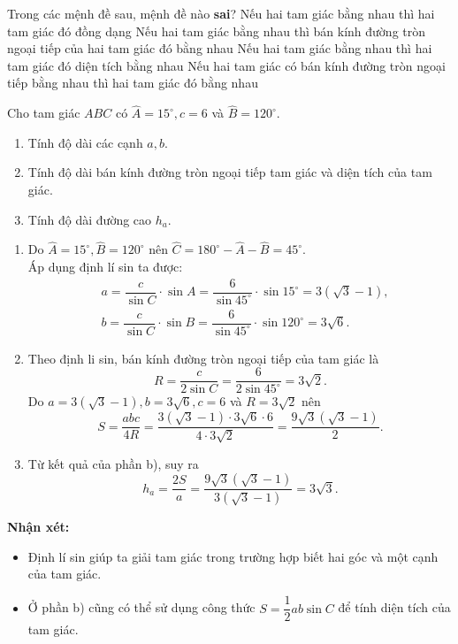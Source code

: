 \begin{ex}%
	Trong các mệnh đề sau, mệnh đề nào \textbf{sai}? 
	\choice 
		{Nếu hai  tam giác bằng nhau thì hai tam giác đó đồng dạng}
		{Nếu hai tam giác bằng nhau thì bán kính đường tròn ngoại tiếp của hai tam giác đó bằng  nhau}
		{Nếu hai tam giác  bằng nhau thì hai tam giác đó diện tích bằng nhau}
		{\True  Nếu hai tam giác có bán kính đường tròn ngoại tiếp bằng nhau thì hai tam giác đó bằng nhau}
\end{ex}

\begin{bt}%
	Cho tam giác $ABC$ có $\widehat{A}=15^\circ, c=6$ và $\widehat{B}=120^\circ$.
	\begin{enumerate}
		\item Tính độ dài các cạnh $a, b$.
		\item Tính độ dài bán kính đường tròn ngoại tiếp tam giác và diện tích của tam giác.
		\item Tính độ dài đường cao $h_a$.
	\end{enumerate}
	\loigiai
	{
	\begin{enumerate}
		\item Do $\widehat{A}=15^\circ, \widehat{B}=120^\circ$ nên $\widehat{C}=180^\circ-\widehat{A}-\widehat{B}=45^\circ$.\\
		Áp dụng định lí sin ta được:
		$$
		\begin{aligned}
		&a=\dfrac{c}{\sin C}\cdot\sin A=\dfrac{6}{\sin 45^\circ}\cdot\sin 15^\circ=3(\sqrt{3}-1),\\
		&b=\dfrac{c}{\sin C}\cdot\sin B=\dfrac{6}{\sin 45^\circ}\cdot\sin 120^\circ=3\sqrt{6}.
		\end{aligned}$$
		\item Theo định li sin, bán kính đường tròn ngoại tiếp của tam giác là
		$$R=\dfrac{c}{2\sin C}=\dfrac{6}{2\sin 45^\circ}=3\sqrt{2}.$$
		Do $a=3(\sqrt{3}-1), b=3\sqrt{6}, c=6$ và $R=3\sqrt{2}$ nên
		$$S=\dfrac{a b c}{4R}=\dfrac{3(\sqrt{3}-1)\cdot 3\sqrt{6}\cdot 6}{4\cdot 3\sqrt{2}}=\dfrac{9\sqrt{3}(\sqrt{3}-1)}{2}.$$
		\item Từ kết quả của phần b), suy ra $$h_a=\dfrac{2S}{a}=\dfrac{9\sqrt{3}(\sqrt{3}-1)}{3(\sqrt{3}-1)}=3\sqrt{3}.$$
	\end{enumerate}
	\textbf{Nhận xét:}
	\begin{itemize}
		\item Định lí sin giúp ta giải tam giác trong trường hợp biết hai góc và một cạnh của tam giác.
		\item Ở phần b) cũng có thể sử dụng công thức $S=\dfrac{1}{2}ab\sin C$ để tính diện tích của tam giác.
	\end{itemize}		
	}
\end{bt}

